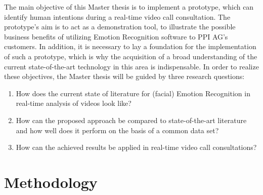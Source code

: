 \documentclass[11pt,a4paper]{scrbook}
\begin{document}
The main objective of this Master thesis is to implement a prototype, which can identify human intentions during a real-time video call consultation. The prototype's aim is to act as a demonstration tool, to illustrate the possible business benefits of utilizing Emotion Recognition software to PPI AG's customers.
\newline\newline
In addition, it is necessary to lay a foundation for the implementation of such a prototype, which is why the acquisition of a broad understanding of the current state-of-the-art technology in this area is indispensable.
\newline\newline
In order to realize these objectives, the Master thesis will be guided by three research questions:
\newline
\begin{enumerate}
	\item How does the current state of literature for (facial) Emotion Recognition in real-time analysis of videos look like?
	\item How can the proposed approach be compared to state-of-the-art literature and how well does it perform on the basis of a common data set?
    \item How can the achieved results be applied in real-time video call consultations? 
\end{enumerate}

\chapter{Methodology}

\end{document}
